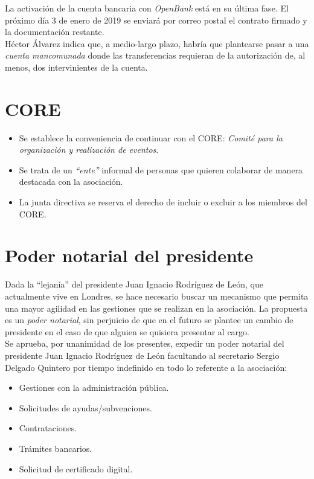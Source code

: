 \documentclass[a4paper, 12pt]{article}
\begin{document}
La activación de la cuenta bancaria con \textit{OpenBank} está en su última fase. El próximo día 3 de enero de 2019 se enviará por correo postal el contrato firmado y la documentación restante.\\

Héctor Álvarez indica que, a medio-largo plazo, habría que plantearse pasar a una \textit{cuenta mancomunada} donde las transferencias requieran de la autorización de, al menos, dos intervinientes de la cuenta.

\section{CORE}

\begin{itemize}
    \item Se establece la conveniencia de continuar con el CORE: \textit{Comité para la organización y realización de eventos}.
    \item Se trata de un \textit{``ente''} informal de personas que quieren colaborar de manera destacada con la asociación.
    \item La junta directiva se reserva el derecho de incluir o excluir a los miembros del CORE.
\end{itemize}

\section{Poder notarial del presidente}

Dada la ``lejanía'' del presidente Juan Ignacio Rodríguez de León, que actualmente vive en Londres, se hace necesario buscar un mecanismo que permita una mayor agilidad en las gestiones que se realizan en la asociación. La propuesta es un \textit{poder notarial}, sin perjuicio de que en el futuro se plantee un cambio de presidente en el caso de que alguien se quisiera presentar al cargo.\\

Se aprueba, por unanimidad de los presentes, expedir un poder notarial del presidente Juan Ignacio Rodríguez de León facultando al secretario Sergio Delgado Quintero por tiempo indefinido en todo lo referente a la asociación:

\begin{itemize}
    \item Gestiones con la administración pública.
    \item Solicitudes de ayudas/subvenciones.
    \item Contrataciones.
    \item Trámites bancarios.
    \item Solicitud de certificado digital.
\end{itemize}
\end{document}
